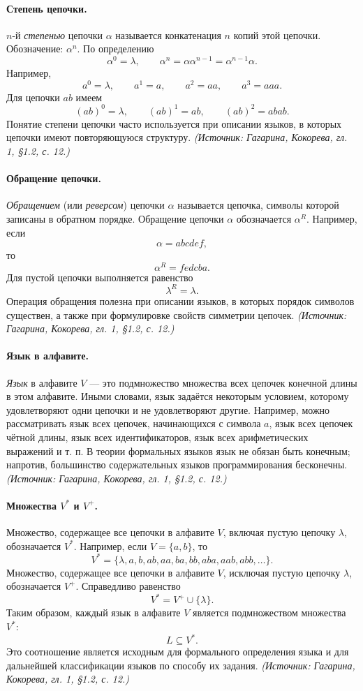 \documentclass[a4paper,12pt]{article}
\begin{document}
\paragraph{Степень цепочки.}
\(n\)-й \emph{степенью} цепочки \(\alpha\) называется конкатенация \(n\) копий этой цепочки. Обозначение: \(\alpha^n\). По определению
\[
\alpha^0=\lambda,\qquad
\alpha^n=\alpha\alpha^{n-1}=\alpha^{n-1}\alpha.
\]
Например,
\[
a^0=\lambda,\qquad
a^1=a,\qquad
a^2=aa,\qquad
a^3=aaa.
\]
Для цепочки \(ab\) имеем
\[
(ab)^0=\lambda,\qquad
(ab)^1=ab,\qquad
(ab)^2=abab.
\]
Понятие степени цепочки часто используется при описании языков, в которых цепочки имеют повторяющуюся структуру.
\textit{(Источник: Гагарина, Кокорева, гл. 1, §1.2, с. 12.)}

\paragraph{Обращение цепочки.}
\emph{Обращением} (или \emph{реверсом}) цепочки \(\alpha\) называется цепочка, символы которой записаны в обратном порядке. Обращение цепочки \(\alpha\) обозначается \(\alpha^R\). Например, если
\[
\alpha=abcdef,
\]
то
\[
\alpha^R=fedcba.
\]
Для пустой цепочки выполняется равенство
\[
\lambda^R=\lambda.
\]
Операция обращения полезна при описании языков, в которых порядок символов существен, а также при формулировке свойств симметрии цепочек.
\textit{(Источник: Гагарина, Кокорева, гл. 1, §1.2, с. 12.)}

\paragraph{Язык в алфавите.}
\emph{Язык} в алфавите \(V\) — это подмножество множества всех цепочек конечной длины в этом алфавите. Иными словами, язык задаётся некоторым условием, которому удовлетворяют одни цепочки и не удовлетворяют другие. Например, можно рассматривать язык всех цепочек, начинающихся с символа \(a\), язык всех цепочек чётной длины, язык всех идентификаторов, язык всех арифметических выражений и т. п. В теории формальных языков язык не обязан быть конечным; напротив, большинство содержательных языков программирования бесконечны.
\textit{(Источник: Гагарина, Кокорева, гл. 1, §1.2, с. 12.)}

\paragraph{Множества \(V^*\) и \(V^+\).}
Множество, содержащее все цепочки в алфавите \(V\), включая пустую цепочку \(\lambda\), обозначается \(V^*\). Например, если \(V=\{a,b\}\), то
\[
V^*=\{\lambda,a,b,ab,aa,ba,bb,aba,aab,abb,\ldots\}.
\]
Множество, содержащее все цепочки в алфавите \(V\), исключая пустую цепочку \(\lambda\), обозначается \(V^+\). Справедливо равенство
\[
V^*=V^+\cup\{\lambda\}.
\]
Таким образом, каждый язык в алфавите \(V\) является подмножеством множества \(V^*\):
\[
L\subseteq V^*.
\]
Это соотношение является исходным для формального определения языка и для дальнейшей классификации языков по способу их задания.
\textit{(Источник: Гагарина, Кокорева, гл. 1, §1.2, с. 12.)}
\end{document}

